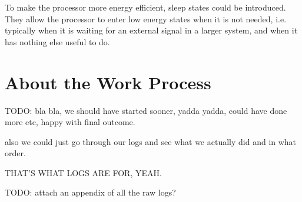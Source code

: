 To make the processor more energy efficient, sleep states could be introduced.
They allow the processor to enter low energy states when it is not needed, i.e. typically when it is waiting for an external signal in a larger system, and when it has nothing else useful to do.

\section{About the Work Process}

TODO: bla bla, we should have started sooner, yadda yadda, could have done more etc, happy with final outcome.

also we could just go through our logs and see what we actually did and in what order.

THAT'S WHAT LOGS ARE FOR, YEAH.

TODO: attach an appendix of all the raw logs?
